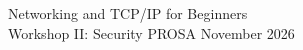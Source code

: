 \documentclass[Screen16to9,17pt]{foils}
\begin{document}



%



%
%
%
%
%



\mytitlepage
{Networking and TCP/IP for Beginners\\Workshop II: Security}
{PROSA November 2026}
\end{document}
